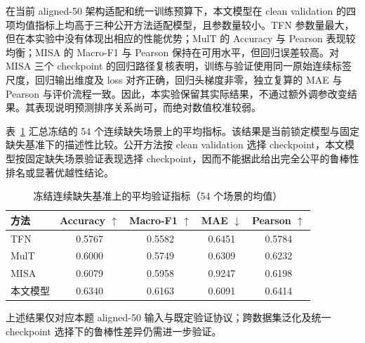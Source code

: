 在当前 aligned-50 架构适配和统一训练预算下，本文模型在 clean validation 的四项均值指标上均高于三种公开方法适配模型，且参数量较小。TFN 参数量最大，但在本实验中没有体现出相应的性能优势；MulT 的 Accuracy 与 Pearson 表现较均衡；MISA 的 Macro-F1 与 Pearson 保持在可用水平，但回归误差较高。对 MISA 三个 checkpoint 的回归路径复核表明，训练与验证使用同一原始连续标签尺度，回归输出维度及 loss 对齐正确，回归头梯度非零，独立复算的 MAE 与 Pearson 与评价流程一致。因此，本实验保留其实际结果，不通过额外调参改变结果。其表现说明预测排序关系尚可，而绝对数值校准较弱。

表~\ref{tab:q2-missing-model-comparison} 汇总冻结的 54 个连续缺失场景上的平均指标。该结果是当前锁定模型与固定缺失基准下的描述性比较。公开方法按 clean validation 选择 checkpoint，本文模型按固定缺失场景验证表现选择 checkpoint，因而不能据此给出完全公平的鲁棒性排名或显著优越性结论。

\begin{table}[htbp]
\centering
\small
\setlength{\tabcolsep}{5pt}
\caption{冻结连续缺失基准上的平均验证指标（54 个场景的均值）}
\label{tab:q2-missing-model-comparison}
\begin{tabular}{l c c c c}
\toprule
方法 & Accuracy $\uparrow$ & Macro-F1 $\uparrow$ & MAE $\downarrow$ & Pearson $\uparrow$ \\
\midrule
TFN & 0.5767 & 0.5582 & 0.6451 & 0.5784 \\
MulT & 0.6000 & 0.5749 & 0.6309 & 0.6232 \\
MISA & 0.6079 & 0.5958 & 0.9247 & 0.6198 \\
本文模型 & 0.6340 & 0.6163 & 0.6091 & 0.6414 \\
\bottomrule
\end{tabular}
\end{table}

上述结果仅对应本题 aligned-50 输入与既定验证协议；跨数据集泛化及统一 checkpoint 选择下的鲁棒性差异仍需进一步验证。

